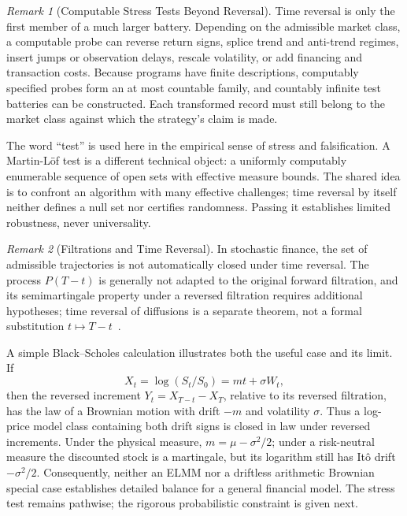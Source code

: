 \documentclass[aps,pra,reprint,superscriptaddress,amsmath,amssymb,floatfix]{revtex4-2}
\theoremstyle{plain}
\theoremstyle{definition}
\theoremstyle{remark}
\newtheorem{remark}{Remark}
\begin{document}
\begin{remark}[Computable Stress Tests Beyond Reversal]
\label{rem:stressfamily}
Time reversal is only the first member of a much larger battery. Depending on
the admissible market class, a computable probe can reverse return signs,
splice trend and anti-trend regimes, insert jumps or observation delays,
rescale volatility, or add financing and transaction costs. Because programs
have finite descriptions, computably specified probes form an at most
countable family, and countably infinite test batteries can be constructed.
Each transformed record must still belong to the market class against which
the strategy's claim is made.

The word ``test'' is used here in the empirical sense of stress and
falsification. A Martin-L\"of test is a different technical object: a uniformly
computably enumerable sequence of open sets with effective measure bounds.
The shared idea is to confront an algorithm with many effective challenges;
time reversal by itself neither defines a null set nor certifies randomness.
Passing it establishes limited robustness, never universality.
\end{remark}

\begin{remark}[Filtrations and Time Reversal]
In stochastic finance, the set of admissible trajectories is not automatically
closed under time reversal. The process \(P(T-t)\) is generally not adapted to
the original forward filtration, and its semimartingale property under a
reversed filtration requires additional hypotheses; time reversal of
diffusions is a separate theorem, not a formal substitution
\(t\mapsto T-t\)~\cite{HaussmannPardoux1986}.

A simple Black--Scholes calculation illustrates both the useful case and its
limit. If
\[
  X_t=\log(S_t/S_0)=mt+\sigma W_t,
\]
then the reversed increment \(Y_t=X_{T-t}-X_T\), relative to its reversed
filtration, has the law of a Brownian motion with drift \(-m\) and volatility
\(\sigma\). Thus a log-price model class containing both drift signs is closed
in law under reversed increments. Under the physical measure,
\(m=\mu-\sigma^2/2\); under a risk-neutral measure the discounted stock is a
martingale, but its logarithm still has It\^o drift \(-\sigma^2/2\).
Consequently, neither an ELMM nor a driftless arithmetic Brownian special case
establishes detailed balance for a general financial model. The stress test
remains pathwise; the rigorous probabilistic constraint is given next.
\end{remark}
\end{document}
